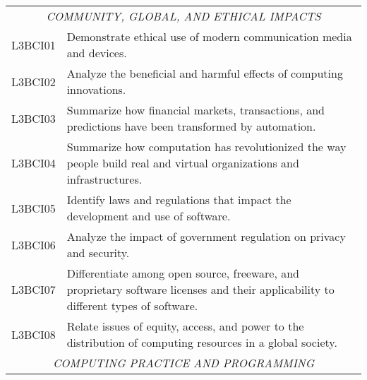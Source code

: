 \begin{longtable}{p{1.8cm}p{11cm}}
 \multicolumn{2}{c}{\textit{COMMUNITY, GLOBAL, AND ETHICAL IMPACTS}}                                                                                                                                                                                \\
 L3BCI01 & Demonstrate ethical use of modern communication media and devices.                                                                                                                                                         \\
 L3BCI02 & Analyze the beneficial and harmful effects of computing innovations.                                                                                                                                                       \\
 L3BCI03 & Summarize how financial markets, transactions, and predictions have been transformed by automation.                                                                                                                        \\
 L3BCI04 & Summarize how computation has revolutionized the way people build real and virtual organizations and infrastructures.                                                                                                      \\
 L3BCI05 & Identify laws and regulations that impact the development and use of software.                                                                                                                                             \\
 L3BCI06 & Analyze the impact of government regulation on privacy and security.                                                                                                                                                       \\
 L3BCI07 & Differentiate among open source, freeware, and proprietary software licenses and their applicability to different types of software.                                                                                       \\
 L3BCI08 & Relate issues of equity, access, and power to the distribution of computing resources in a global society.                                                                                                                 \\
 \multicolumn{2}{c}{\textit{COMPUTING PRACTICE AND PROGRAMMING}}                                                                                                                                                                                        \\

\end{longtable}

